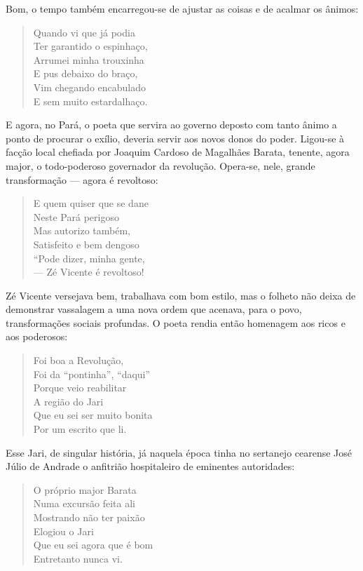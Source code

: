 Bom, o tempo também encarregou-se de ajustar as coisas e de acalmar os
ânimos:

\begin{verse}
Quando vi que já podia\\
Ter garantido o espinhaço, \\
Arrumei minha trouxinha\\
E pus debaixo do braço,\\
Vim chegando encabulado\\
E sem muito estardalhaço.
\end{verse}

E agora, no Pará, o poeta que servira ao governo deposto com tanto
ânimo a ponto de procurar o exílio, deveria servir aos novos donos do
poder. Ligou-se à facção local chefiada por Joaquim Cardoso de
Magalhães Barata, tenente, agora major, o todo-poderoso governador da
revolução. Opera-se, nele, grande transformação — agora é revoltoso: 

\begin{verse}
E quem quiser que se dane\\
Neste Pará perigoso\\
Mas autorizo também,\\
Satisfeito e bem dengoso\\
“Pode dizer, minha gente,\\
— Zé Vicente é revoltoso!
\end{verse}

Zé Vicente versejava bem, trabalhava com bom estilo, mas o folheto não
deixa de demonstrar vassalagem a uma nova ordem que acenava, para o
povo, transformações sociais profundas. O poeta rendia então
homenagem aos ricos e aos poderosos: 

\begin{verse}
Foi boa a Revolução,\\
Foi da “pontinha”, “daqui”\\
Porque veio reabilitar\\
A região do Jari\\
Que eu sei ser muito bonita\\
Por um escrito que li.
\end{verse}

Esse Jari, de singular história, já naquela época tinha no sertanejo
cearense José Júlio de Andrade o anfitrião hospitaleiro de eminentes
autoridades:

\begin{verse}
O próprio major Barata\\
Numa excursão feita ali\\
Mostrando não ter paixão\\
Elogiou o Jari\\
Que eu sei agora que é bom\\
Entretanto nunca vi.
\end{verse}

